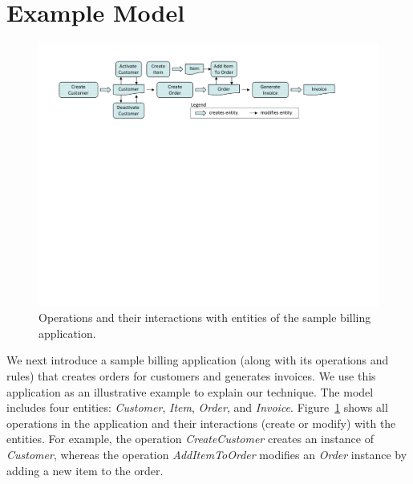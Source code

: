 \section{Example Model}

\begin{figure}
\centering
\includegraphics[trim=45 435 40 38,clip,width=7.5in]{figs/appModel.pdf}
\caption{Operations and their interactions with entities of the sample billing application.}
\label{fig:sample-app}
\end{figure}

We next introduce a sample billing application (along with its operations and rules) that creates 
orders for customers and generates invoices. We use this application as an illustrative example to explain our technique. The 
model includes four entities: \textit{Customer}, \textit{Item}, \textit{Order}, and \textit{Invoice}.
Figure~\ref{fig:sample-app} shows all operations in the application and their interactions (create or modify) with the entities.
For example, the operation \textit{CreateCustomer} creates an instance of \textit{Customer}, whereas
the operation \textit{AddItemToOrder} modifies an \textit{Order} instance by adding a new item to the order.

